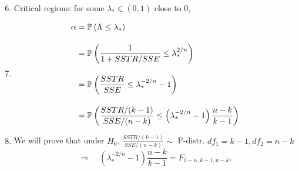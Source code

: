 \begin{frame}[fragile]

	\begin{enumerate}
		\setcounter{enumi}{5}
	\item Critical regions: for some $\lambda_*\in (0,1)$ close to $0$,
		\vfill
	\item[]
			\begin{align*}
				\alpha & = \mathbb{P} \left(\Lambda \le \lambda_* \right)
				\\[1em]&=
				     \mathbb{P} \left(  \frac{1}{1+SSTR/SSE}\le \lambda_*^{2/n}\right )
				     \\[1em]&=
				     \mathbb{P} \left(   \frac{SSTR}{SSE} \le \lambda_*^{-2/n}-1\right )
				     \\[1em]&=
				     \mathbb{P} \left(   \frac{SSTR/(k-1)}{SSE/(n-k)} \le \left(\lambda_*^{-2/n}-1\right) \frac{n-k}{k-1}\right )
			\end{align*}
			\vfill
		\item We will prove that under $H_0$, $ \frac{SSTR/(k-1)}{SSE/(n-k)}\sim$ F-distr. $df_1=k-1, df_2=n-k$
			\vfill
			\[
				\Rightarrow\quad\left(\lambda_*^{-2/n}-1\right) \frac{n-k}{k-1} = F_{1-\alpha,k-1,n-k}.
			\]
			\myEnd
	\end{enumerate}
\end{frame}
